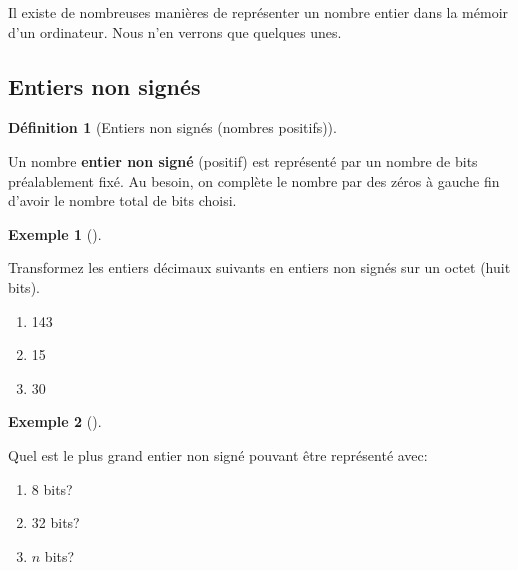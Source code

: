 \documentclass[
  letterpaper,
]{scrbook}
\providecommand{\tightlist}{%
  \setlength{\itemsep}{0pt}\setlength{\parskip}{0pt}}\usepackage{longtable,booktabs,array}
\theoremstyle{definition}
\newtheorem{example}{Exemple}[chapter]
\theoremstyle{definition}
\newtheorem{definition}{Définition}[chapter]
\theoremstyle{plain}
\theoremstyle{remark}
\begin{document}
Il existe de nombreuses manières de représenter un nombre entier dans la
mémoir d'un ordinateur. Nous n'en verrons que quelques unes.

\hypertarget{entiers-non-signuxe9s}{%
\subsection{Entiers non signés}\label{entiers-non-signuxe9s}}

\leavevmode{}%
\begin{definition}[Entiers non signés (nombres
positifs)]\label{def-entiers-non-signes}

Un nombre \textbf{entier non signé} (positif) est représenté par un
nombre de bits préalablement fixé. Au besoin, on complète le nombre par
des zéros à gauche fin d'avoir le nombre total de bits choisi.

\end{definition}

\leavevmode{}%
\begin{example}[]\label{exm-entiers-non-signes}

Transformez les entiers décimaux suivants en entiers non signés sur un
octet (huit bits).

\begin{enumerate}
\def\labelenumi{\alph{enumi})}
\tightlist
\item
  143
\item
  15
\item
  30
\end{enumerate}

\end{example}

\leavevmode{}%
\begin{example}[]\label{exm-plus-grand-entier-non-signe}

Quel est le plus grand entier non signé pouvant être représenté avec:

\begin{enumerate}
\def\labelenumi{\alph{enumi})}
\tightlist
\item
  8 bits?
\item
  32 bits?
\item
  \(n\) bits?
\end{enumerate}

\end{example}
\end{document}
